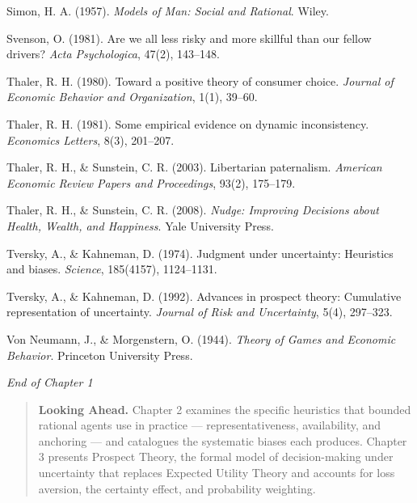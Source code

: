 \documentclass[12pt, letterpaper]{article}
\begin{document}
Simon, H. A. (1957). \textit{Models of Man: Social and Rational}. Wiley.

Svenson, O. (1981). Are we all less risky and more skillful than our fellow drivers? \textit{Acta Psychologica}, 47(2), 143--148.

Thaler, R. H. (1980). Toward a positive theory of consumer choice. \textit{Journal of Economic Behavior and Organization}, 1(1), 39--60.

Thaler, R. H. (1981). Some empirical evidence on dynamic inconsistency. \textit{Economics Letters}, 8(3), 201--207.

Thaler, R. H., \& Sunstein, C. R. (2003). Libertarian paternalism. \textit{American Economic Review Papers and Proceedings}, 93(2), 175--179.

Thaler, R. H., \& Sunstein, C. R. (2008). \textit{Nudge: Improving Decisions about Health, Wealth, and Happiness}. Yale University Press.

Tversky, A., \& Kahneman, D. (1974). Judgment under uncertainty: Heuristics and biases. \textit{Science}, 185(4157), 1124--1131.

Tversky, A., \& Kahneman, D. (1992). Advances in prospect theory: Cumulative representation of uncertainty. \textit{Journal of Risk and Uncertainty}, 5(4), 297--323.

Von Neumann, J., \& Morgenstern, O. (1944). \textit{Theory of Games and Economic Behavior}. Princeton University Press.

\medskip

\textit{End of Chapter 1}

\medskip

\begin{quote}
\textbf{Looking Ahead.} Chapter 2 examines the specific heuristics that bounded rational agents use in practice --- representativeness, availability, and anchoring --- and catalogues the systematic biases each produces. Chapter 3 presents Prospect Theory, the formal model of decision-making under uncertainty that replaces Expected Utility Theory and accounts for loss aversion, the certainty effect, and probability weighting.
\end{quote}
\end{document}
